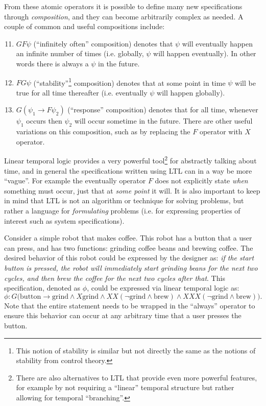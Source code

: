 From these atomic operators it is possible to define many new specifications through \textit{composition}, and they can become arbitrarily complex as needed. A couple of common and useful compositions include:
\begin{enumerate}
\setcounter{enumi}{10}
    \item $GF \psi$ (``infinitely often'' composition) denotes that $\psi$ will eventually happen an infinite number of times (i.e. globally, $\psi$ will happen eventually). In other words there is always a $\psi$ in the future.
    \item $FG \psi$ (``stability''\footnote{This notion of stability is similar but not directly the same as the notions of stability from control theory.} composition) denotes that at some point in time $\psi$ will be true for all time thereafter (i.e. eventually $\psi$ will happen globally).
    \item $G(\psi_1 \to F\psi_2)$ (``response'' composition) denotes that for all time, whenever $\psi_1$ occurs then $\psi_2$ will occur sometime in the future. There are other useful variations on this composition, such as by replacing the $F$ operator with $X$ operator.
\end{enumerate}

Linear temporal logic provides a very powerful tool\footnote{There are also alternatives to LTL that provide even more powerful features, for example by not requiring a ``linear'' temporal structure but rather allowing for temporal ``branching''.} for abstractly talking about time, and in general the specifications written using LTL can in a way be more ``vague''. For example the eventually operator $F$ does not explicitly state \textit{when} something must occur, just that at \textit{some point} it will. It is also important to keep in mind that LTL is not an algorithm or technique for solving problems, but rather a language for \textit{formulating} problems (i.e. for expressing properties of interest such as system specifications). 

\begin{example} \label{ex:coffeespec}
Consider a simple robot that makes coffee. This robot has a button that a user can press, and has two functions: grinding coffee beans and brewing coffee. The desired behavior of this robot could be expressed by the designer as: \textit{if the start button is pressed, the robot will immediately start grinding beans for the next two cycles, and then brew the coffee for the next two cycles after that}. This specification, denoted as $\phi$, could be expressed via linear temporal logic as:
\begin{equation*}
\phi : G \big( \text{button} \to \text{grind} \land X \text{grind} \land XX (\lnot\text{grind} \land \text{brew}) \land XXX (\lnot\text{grind} \land\text{brew}) \big).
\end{equation*}
Note that the entire statement needs to be wrapped in the ``always'' operator to ensure this behavior can occur at any arbitrary time that a user presses the button.
\end{example}


